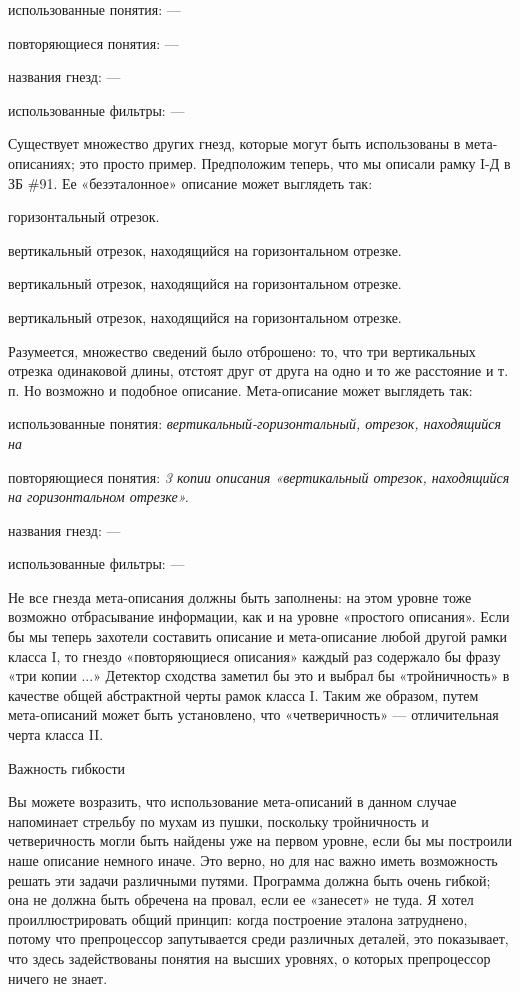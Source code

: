 \documentclass[../main.tex]{subfiles}
\begin{document}
использованные понятия: ---

повторяющиеся понятия: ---

названия гнезд: ---

использованные фильтры: ---

Существует множество других гнезд, которые могут быть использованы в мета-описаниях; это просто пример. Предположим теперь, что мы описали рамку I-Д в ЗБ \#91. Ее «безэталонное» описание может выглядеть так:

горизонтальный отрезок.

вертикальный отрезок, находящийся на горизонтальном отрезке.

вертикальный отрезок, находящийся на горизонтальном отрезке.

вертикальный отрезок, находящийся на горизонтальном отрезке.

Разумеется, множество сведений было отброшено: то, что три вертикальных отрезка одинаковой длины, отстоят друг от друга на одно и то же расстояние и т. п. Но возможно и подобное описание. Мета-описание может выглядеть так:

использованные понятия: \emph{вертикальный-горизонтальный, отрезок, находящийся на}

повторяющиеся понятия: \emph{3 копии описания «вертикальный отрезок, находящийся на горизонтальном отрезке».}

названия гнезд: ---

использованные фильтры: ---

Не все гнезда мета-описания должны быть заполнены: на этом уровне тоже возможно отбрасывание информации, как и на уровне «простого описания». Если бы мы теперь захотели составить описание и мета-описание любой другой рамки класса I, то гнездо «повторяющиеся описания» каждый раз содержало бы фразу «три копии ...» Детектор сходства заметил бы это и выбрал бы «тройничность» в качестве общей абстрактной черты рамок класса I. Таким же образом, путем мета-описаний может быть установлено, что «четверичность» --- отличительная черта класса II.

Важность гибкости

Вы можете возразить, что использование мета-описаний в данном случае напоминает стрельбу по мухам из пушки, поскольку тройничность и четверичность могли быть найдены уже на первом уровне, если бы мы построили наше описание немного иначе. Это верно, но для нас важно иметь возможность решать эти задачи различными путями. Программа должна быть очень гибкой; она не должна быть обречена на провал, если ее «занесет» не туда. Я хотел проиллюстрировать общий принцип: когда построение эталона затруднено, потому что препроцессор запутывается среди различных деталей, это показывает, что здесь задействованы понятия на высших уровнях, о которых препроцессор ничего не знает.
\end{document}
